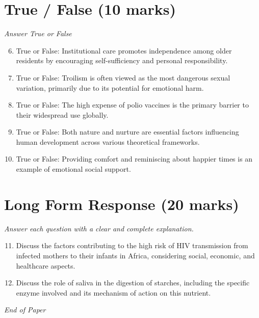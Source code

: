 \documentclass[12pt]{article}
\begin{document}
\section*{True / False (10 marks)}
\textit{Answer True or False}
\begin{enumerate}[label=\arabic*.]
\setcounter{enumi}{5}
\item True or False: Institutional care promotes independence among older residents by encouraging self-sufficiency and personal responsibility.
\item True or False: Troilism is often viewed as the most dangerous sexual variation, primarily due to its potential for emotional harm.
\item True or False: The high expense of polio vaccines is the primary barrier to their widespread use globally.
\item True or False: Both nature and nurture are essential factors influencing human development across various theoretical frameworks.
\item True or False: Providing comfort and reminiscing about happier times is an example of emotional social support.
\end{enumerate}

\section*{Long Form Response (20 marks)}
\textit{Answer each question with a clear and complete explanation.}
\begin{enumerate}[label=\arabic*.]
\setcounter{enumi}{10}
\item Discuss the factors contributing to the high risk of HIV transmission from infected mothers to their infants in Africa, considering social, economic, and healthcare aspects.
\item Discuss the role of saliva in the digestion of starches, including the specific enzyme involved and its mechanism of action on this nutrient.
\end{enumerate}

\vfill
\noindent\textit{End of Paper}
\end{document}
